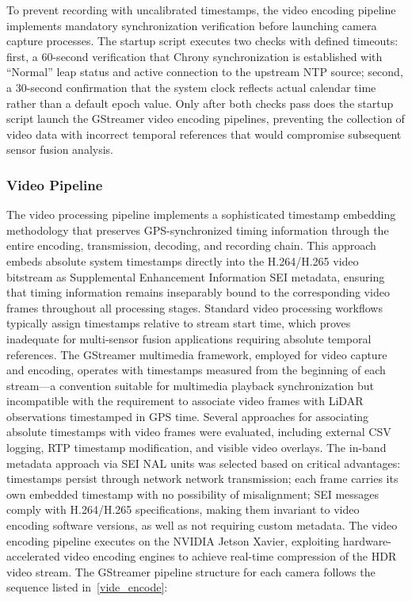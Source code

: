 \documentclass{erauthesis}
\begin{document}
To prevent recording with uncalibrated timestamps, the video encoding pipeline implements mandatory synchronization verification before launching camera capture processes. The startup script executes two checks with defined timeouts: first, a 60-second verification that Chrony synchronization is established with ``Normal'' leap status and active connection to the upstream \ac{NTP} source; second, a 30-second confirmation that the system clock reflects actual calendar time rather than a default epoch value. Only after both checks pass does the startup script launch the GStreamer video encoding pipelines, preventing the collection of video data with incorrect temporal references that would compromise subsequent sensor fusion analysis.
            
\subsubsection{Video Pipeline} \label{video pipeline}
            
The video processing pipeline implements a sophisticated timestamp embedding methodology that preserves GPS-synchronized timing information through the entire encoding, transmission, decoding, and recording chain. This approach embeds absolute system timestamps directly into the H.264/H.265 video bitstream as Supplemental Enhancement Information \ac{SEI} metadata, ensuring that timing information remains inseparably bound to the corresponding video frames throughout all processing stages.
Standard video processing workflows typically assign timestamps relative to stream start time, which proves inadequate for multi-sensor fusion applications requiring absolute temporal references. The GStreamer multimedia framework, employed for video capture and encoding, operates with timestamps measured from the beginning of each stream---a convention suitable for multimedia playback synchronization but incompatible with the requirement to associate video frames with LiDAR observations timestamped in GPS time. Several approaches for associating absolute timestamps with video frames were evaluated, including external CSV logging, \ac{RTP} timestamp modification, and visible video overlays. The in-band metadata approach via \ac{SEI} \ac{NAL} units was selected based on critical advantages: timestamps persist through network network transmission; each frame carries its own embedded timestamp with no possibility of misalignment; \ac{SEI} messages comply with H.264/H.265 specifications, making them invariant to video encoding software versions, as well as not requiring custom metadata.
The video encoding pipeline executes on the NVIDIA Jetson Xavier, exploiting hardware-accelerated video encoding engines to achieve real-time compression of the HDR video stream. The GStreamer pipeline structure for each camera follows the sequence listed in~\ref{vide_encode}: 
\end{document}
